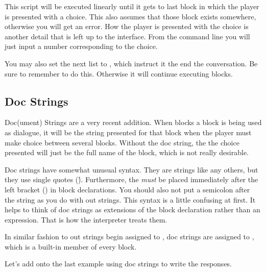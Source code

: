 This script will be executed linearly until it gets to last block in which the player is presented with a choice.  This also assumes that those block exists somewhere, otherwise you will get an error.  How the player is presented with the choice is another detail that is left up to the interface.  From the command line you will just input a number corresponding to the choice.

You may also set the next list to , which instruct it the end the conversation.  Be sure to remember to do this.  Otherwise it will continue executing blocks.

\subsection{Doc Strings}
Doc(ument) Strings are a very recent addition.  When blocks a block is being used as dialogue, it will be the string presented for that block when the player must make choice between several blocks.  Without the doc string, the the choice presented will just be the full name of the block, which is not really desirable.

Doc strings have somewhat unusual syntax.  They are strings like any others, but they use single quotes (\').  Furthermore, the \emph{must} be placed immediately after the left bracket (\SSCode{\{}) in block declarations.  You should also not put a semicolon after the string as you do with out strings.  This syntax is a little confusing at first.  It helps to think of doc strings as extensions of the block declaration rather than an expression.  That is how the interpreter treats them.

In similar fashion to out strings begin assigned to , doc strings are assigned to , which is a built-in member of every block.

Let's add onto the last example using doc strings to write the responses.

